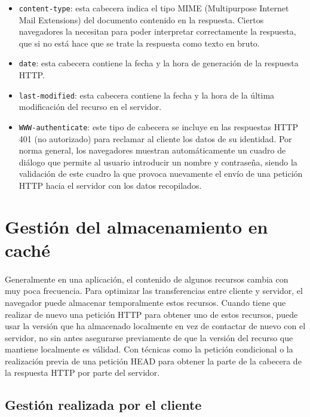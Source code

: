 \documentclass{article}
\begin{document}
\begin{itemize}
		\item \texttt{content-type}: esta cabecera indica el tipo MIME (Multipurpose Internet Mail Extensions) del documento contenido en la respuesta. Ciertos navegadores la necesitan para poder interpretar correctamente la respuesta, que si no está hace que se trate la respuesta como texto en bruto.
		\item \texttt{date}: esta cabecera contiene la fecha y la hora de generación de la respuesta HTTP.
		\item \texttt{last-modified}: esta cabecera contiene la fecha y la hora de la última modificación del recurso en el servidor.
		\item \texttt{WWW-authenticate}: este tipo de cabecera se incluye en las respuestas HTTP 401 (no autorizado) para reclamar al cliente los datos de su identidad. Por norma general, los navegadores muestran automáticamente un cuadro de diálogo que permite al usuario introducir un nombre y contraseña, siendo la validación de este cuadro la que provoca nuevamente el envío de una petición HTTP hacia el servidor con los datos recopilados.
	\end{itemize}
	
	\section{Gestión del almacenamiento en caché}
	
	\paragraph{}Generalmente en una aplicación, el contenido de algunos recursos cambia con muy poca frecuencia. Para optimizar las transferencias entre cliente y servidor, el navegador puede almacenar temporalmente estos recursos. Cuando tiene que realizar de nuevo una petición HTTP para obtener uno de estos recursos, puede usar la versión que ha almacenado localmente en vez de contactar de nuevo con el servidor, no sin antes asegurarse previamente de que la versión del recurso que mantiene localmente es válidad. Con técnicas como la petición condicional o la realización previa de una petición HEAD para obtener la parte de la cabecera de la respuesta HTTP por parte del servidor.
	
	\subsection{Gestión realizada por el cliente}
	
\end{document}
